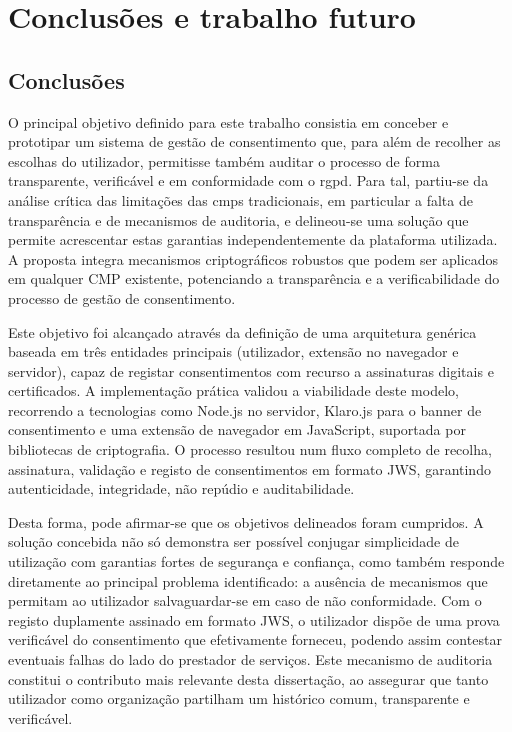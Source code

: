 \chapter{Conclusões e trabalho futuro}
\label{cap:conclusoes}

\section{Conclusões}

O principal objetivo definido para este trabalho consistia em conceber e prototipar um sistema de gestão de consentimento que, para além de recolher as escolhas do utilizador, permitisse também auditar o processo de forma transparente, verificável e em conformidade com o \acrshort{rgpd}. Para tal, partiu-se da análise crítica das limitações das \acrshort{cmp}s tradicionais, em particular a falta de transparência e de mecanismos de auditoria, e delineou-se uma solução que permite acrescentar estas garantias independentemente da plataforma utilizada. A proposta integra mecanismos criptográficos robustos que podem ser aplicados em qualquer CMP existente, potenciando a transparência e a verificabilidade do processo de gestão de consentimento.

Este objetivo foi alcançado através da definição de uma arquitetura genérica baseada em três entidades principais (utilizador, extensão no navegador e servidor), capaz de registar consentimentos com recurso a assinaturas digitais e certificados. A implementação prática validou a viabilidade deste modelo, recorrendo a tecnologias como Node.js no servidor, Klaro.js para o banner de consentimento e uma extensão de navegador em JavaScript, suportada por bibliotecas de criptografia. O processo resultou num fluxo completo de recolha, assinatura, validação e registo de consentimentos em formato JWS, garantindo autenticidade, integridade, não repúdio e auditabilidade.

Desta forma, pode afirmar-se que os objetivos delineados foram cumpridos. A solução concebida não só demonstra ser possível conjugar simplicidade de utilização com garantias fortes de segurança e confiança, como também responde diretamente ao principal problema identificado: a ausência de mecanismos que permitam ao utilizador salvaguardar-se em caso de não conformidade. Com o registo duplamente assinado em formato JWS, o utilizador dispõe de uma prova verificável do consentimento que efetivamente forneceu, podendo assim contestar eventuais falhas do lado do prestador de serviços. Este mecanismo de auditoria constitui o contributo mais relevante desta dissertação, ao assegurar que tanto utilizador como organização partilham um histórico comum, transparente e verificável.

